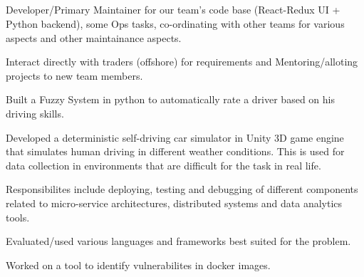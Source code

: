 \documentclass[letterpaper]{deedy-resume} %
\begin{document}
\begin{minipage}[t]{0.66\textwidth} %

\subsection{}

\vspace{\topsep} %
\begin{tightitemize}
\item Developer/Primary Maintainer for our team's code base (React-Redux UI + Python backend), some Ops tasks, co-ordinating with other teams for various aspects and other maintainance aspects.
\item Interact directly with traders (offshore) for requirements and Mentoring/alloting projects to new team members.
\end{tightitemize}

\sectionspace %



\begin{tightitemize}
\item Built a Fuzzy System in python to automatically rate a driver based on his driving skills.
\item Developed a deterministic self-driving car simulator in Unity 3D game engine that simulates human driving in different weather conditions. This is used for data collection in environments that are difficult for the task in real life.
\end{tightitemize}

\sectionspace %



\begin{tightitemize}
\item Responsibilites include deploying, testing and debugging of different components related to micro-service architectures, distributed systems and data analytics tools.
\item Evaluated/used various languages and frameworks best suited for the problem.
\item Worked on a tool to identify vulnerabilites in docker images.
\end{tightitemize}


\end{minipage}
\end{document}

